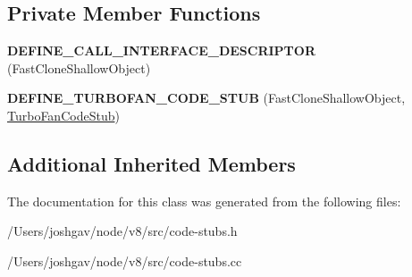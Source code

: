 \subsection*{Private Member Functions}
\begin{DoxyCompactItemize}
\item 
{\bfseries D\+E\+F\+I\+N\+E\+\_\+\+C\+A\+L\+L\+\_\+\+I\+N\+T\+E\+R\+F\+A\+C\+E\+\_\+\+D\+E\+S\+C\+R\+I\+P\+T\+OR} (Fast\+Clone\+Shallow\+Object)\hypertarget{classv8_1_1internal_1_1_fast_clone_shallow_object_stub_a2715177dc25244efde636103cc830cfa}{}\label{classv8_1_1internal_1_1_fast_clone_shallow_object_stub_a2715177dc25244efde636103cc830cfa}

\item 
{\bfseries D\+E\+F\+I\+N\+E\+\_\+\+T\+U\+R\+B\+O\+F\+A\+N\+\_\+\+C\+O\+D\+E\+\_\+\+S\+T\+UB} (Fast\+Clone\+Shallow\+Object, \hyperlink{classv8_1_1internal_1_1_turbo_fan_code_stub}{Turbo\+Fan\+Code\+Stub})\hypertarget{classv8_1_1internal_1_1_fast_clone_shallow_object_stub_a2de8b62cd56745e26f7ffa61ab450d3f}{}\label{classv8_1_1internal_1_1_fast_clone_shallow_object_stub_a2de8b62cd56745e26f7ffa61ab450d3f}

\end{DoxyCompactItemize}
\subsection*{Additional Inherited Members}


The documentation for this class was generated from the following files\+:\begin{DoxyCompactItemize}
\item 
/\+Users/joshgav/node/v8/src/code-\/stubs.\+h\item 
/\+Users/joshgav/node/v8/src/code-\/stubs.\+cc\end{DoxyCompactItemize}
